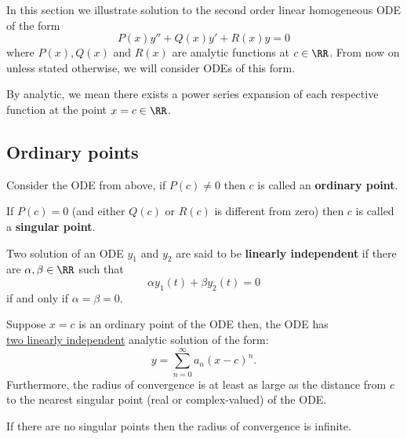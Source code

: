 \documentclass[12pt, a4paper]{article}
\begin{document}
In this section we illustrate solution to the second order linear homogeneous ODE of the form 
\[P(x) y''+Q(x)y'+R(x)y=0\]
where \(P(x),Q(x)\) and \(R(x)\) are analytic functions at \(c \in \RR\). From now on unless stated otherwise, we will consider ODEs of this form.

\begin{mdnote}
    By analytic, we mean there exists a power series expansion of each respective function at the point \(x = c \in \RR\).
\end{mdnote}

\subsection{Ordinary points}

\begin{definition}
    Consider the ODE from above, if \(P(c)\neq0\) then \(c\) is called an \textbf{ordinary point}.
\end{definition}

\begin{definition}
    If \(P(c)=0\) (and either \(Q(c)\) or \(R(c)\) is different from zero) then \(c\) is called a \textbf{singular point}.
\end{definition}

\begin{definition}
    Two solution of an ODE \(y_1\) and \(y_2\) are said to be \textbf{linearly independent} if there are \(\alpha,\beta \in \RR\) such that 
    \[\alpha y_1(t)+\beta y_2(t) =0\]
    if and only if \(\alpha=\beta=0\).
\end{definition}

\begin{mdthm}
    Suppose \(x=c\) is an ordinary point of the ODE then, the ODE has \\ \underline{two linearly independent}  analytic solution of the form:
    \[y = \sum_{n=0}^{\infty} a_n (x-c)^n.\]
    Furthermore, the radius of convergence is at least as large as the distance from \(c\) to the nearest singular point (real or complex-valued) of the ODE.
\end{mdthm}

\begin{mdremark}
    If there are no singular points then the radius of convergence is infinite.
\end{mdremark}
\end{document}
